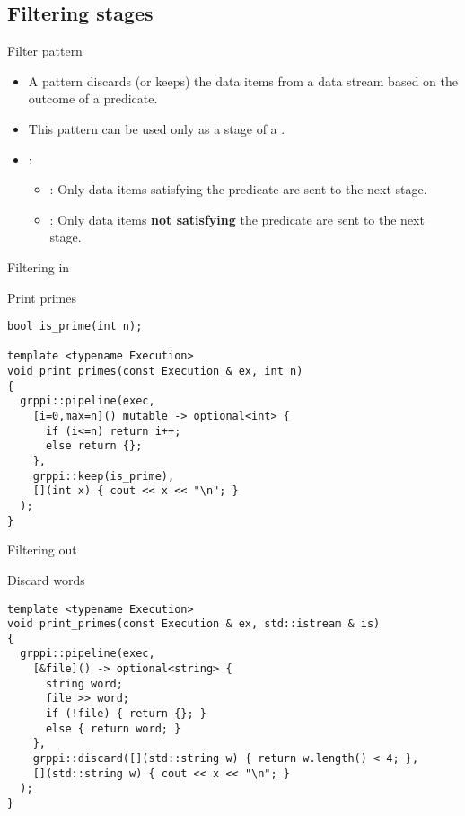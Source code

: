 \subsection{Filtering stages}

\begin{frame}[t]{Filter pattern}
\begin{itemize}
  \item A  pattern discards (or keeps) the data items from a 
        data stream based on the outcome of a predicate.
  \item This pattern can be used only as a stage of a .
  \vfill\pause
  \item {}:
    \begin{itemize}
      \item {}: Only data items satisfying the predicate are sent 
            to the next stage.
      \item {}: Only data items \textbf{\alert{not satisfying}} 
            the predicate are sent to the next stage.
    \end{itemize}
\end{itemize}
\end{frame}

\begin{frame}[t,fragile]{Filtering in}
\begin{block}{Print primes}
\begin{lstlisting}
bool is_prime(int n);

template <typename Execution>
void print_primes(const Execution & ex, int n)
{
  grppi::pipeline(exec,
    [i=0,max=n]() mutable -> optional<int> {
      if (i<=n) return i++;
      else return {};
    },
    grppi::keep(is_prime),
    [](int x) { cout << x << "\n"; }
  );
}
\end{lstlisting}
\end{block}
\end{frame}

\begin{frame}[t,fragile]{Filtering out}
\begin{block}{Discard words}
\begin{lstlisting}
template <typename Execution>
void print_primes(const Execution & ex, std::istream & is)
{
  grppi::pipeline(exec,
    [&file]() -> optional<string> {
      string word;
      file >> word;
      if (!file) { return {}; }
      else { return word; }
    },
    grppi::discard([](std::string w) { return w.length() < 4; },
    [](std::string w) { cout << x << "\n"; }
  );
}
\end{lstlisting}
\end{block}
\end{frame}
